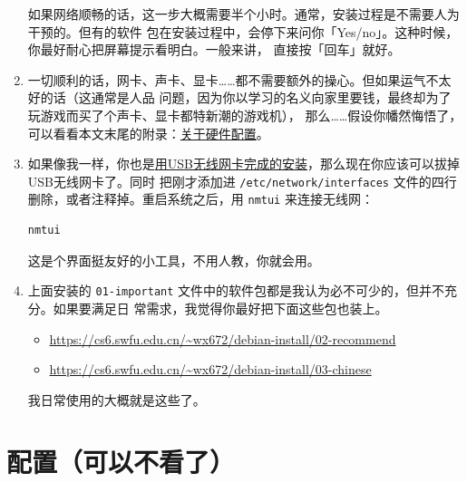 \documentclass{wx672ctexart} \usepackage{hyperref}
\begin{document}
\begin{enumerate}
如果网络顺畅的话，这一步大概需要半个小时。通常，安装过程是不需要人为干预的。但有的软件
包在安装过程中，会停下来问你「Yes/no」。这种时候，你最好耐心把屏幕提示看明白。一般来讲，
直接按「回车」就好。
\item 一切顺利的话，网卡、声卡、显卡……都不需要额外的操心。但如果运气不太好的话（这通常是人品
问题，因为你以学习的名义向家里要钱，最终却为了玩游戏而买了个声卡、显卡都特新潮的游戏机），
那么……假设你幡然悔悟了，可以看看本文末尾的附录：\hyperref[sec:org81b3258]{关于硬件配置}。
\item 如果像我一样，你也是\hyperref[sec:orgf9afa95]{用USB无线网卡完成的安装}，那么现在你应该可以拔掉USB无线网卡了。同时
把刚才添加进 \texttt{/etc/network/interfaces} 文件的四行删除，或者注释掉。重启系统之后，用
\texttt{nmtui} 来连接无线网：
\begin{verbatim}
nmtui
\end{verbatim}

这是个界面挺友好的小工具，不用人教，你就会用。
\item 上面安装的 \texttt{01-important} 文件中的软件包都是我认为必不可少的，但并不充分。如果要满足日
常需求，我觉得你最好把下面这些包也装上。
\begin{itemize}
\item \url{https://cs6.swfu.edu.cn/\~wx672/debian-install/02-recommend}
\item \url{https://cs6.swfu.edu.cn/\~wx672/debian-install/03-chinese}
\end{itemize}

我日常使用的大概就是这些了。
\end{enumerate}

\section{配置（可以不看了）}
\label{sec:orge8febae}
\end{document}
